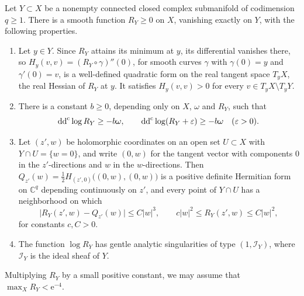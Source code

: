 \begin{lemma}\label{lem:global-normal-pole}
Let $Y\subset X$ be a nonempty connected closed complex submanifold of codimension $q\geq1$. There is a smooth function $R_Y\geq0$ on $X$, vanishing exactly on $Y$, with the following properties.
\begin{enumerate}
\item Let $y\in Y$. Since $R_Y$ attains its minimum at $y$, its differential vanishes there, so $H_y(v,v)=(R_Y\circ\gamma)''(0)$, for smooth curves $\gamma$ with $\gamma(0)=y$ and $\gamma'(0)=v$, is a well-defined quadratic form on the real tangent space $T_yX$, the real Hessian of $R_Y$ at $y$. It satisfies $H_y(v,v)>0$ for every $v\in T_yX\setminus T_yY$.
\item There is a constant $b\geq0$, depending only on $X$, $\omega$ and $R_Y$, such that
\[
 \mathrm{dd}^{\mathrm{c}}\log R_Y\geq-b\omega,\qquad
 \mathrm{dd}^{\mathrm{c}}\log(R_Y+\varepsilon)\geq-b\omega\quad(\varepsilon>0).
\]
\item Let $(z',w)$ be holomorphic coordinates on an open set $U\subset X$ with $Y\cap U=\{w=0\}$, and write $(0,w)$ for the tangent vector with components $0$ in the $z'$-directions and $w$ in the $w$-directions. Then $Q_{z'}(w)=\frac12H_{(z',0)}\bigl((0,w),(0,w)\bigr)$ is a positive definite Hermitian form on $\mathbb C^q$ depending continuously on $z'$, and every point of $Y\cap U$ has a neighborhood on which
\begin{equation}\label{eq:normal-pole-taylor}
 \bigl|R_Y(z',w)-Q_{z'}(w)\bigr|\leq C|w|^3,\qquad c|w|^2\leq R_Y(z',w)\leq C|w|^2,
\end{equation}
for constants $c,C>0$.
\item The function $\log R_Y$ has gentle analytic singularities of type $(1,\mathcal I_Y)$, where $\mathcal I_Y$ is the ideal sheaf of $Y$.
\end{enumerate}
Multiplying $R_Y$ by a small positive constant, we may assume that $\max_XR_Y<\mathrm e^{-4}$.
\end{lemma}
